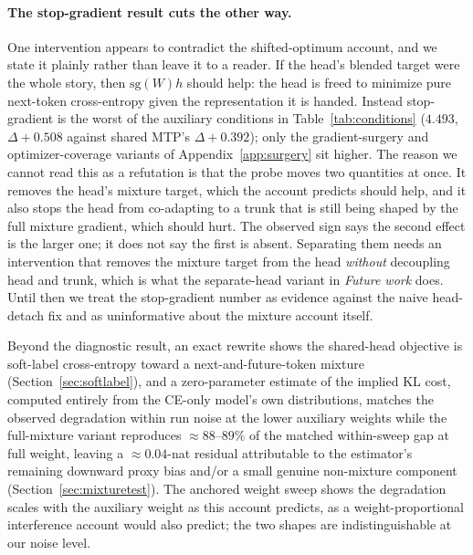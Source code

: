 \paragraph{The stop-gradient result cuts the other way.}
One intervention appears to contradict the shifted-optimum account, and we state it
plainly rather than leave it to a reader. If the head's blended target were the
whole story, then $\mathrm{sg}(W)h$ should help: the head is freed to minimize pure
next-token cross-entropy given the representation it is handed. Instead
stop-gradient is the worst of the auxiliary conditions in
Table~\ref{tab:conditions} ($4.493$, $\Delta{+}0.508$ against shared MTP's
$\Delta{+}0.392$); only the gradient-surgery and optimizer-coverage variants of
Appendix~\ref{app:surgery} sit higher. The reason we cannot read this as a refutation is
that the probe moves two quantities at once. It removes the head's mixture target,
which the account predicts should help, and it also stops the head from co-adapting
to a trunk that is still being shaped by the full mixture gradient, which should
hurt. The observed sign says the second effect is the larger one; it does not say
the first is absent. Separating them needs an intervention that removes the mixture
target from the head \emph{without} decoupling head and trunk, which is what the
separate-head variant in \emph{Future work} does. Until then we treat the
stop-gradient number as evidence against the naive head-detach fix and as
uninformative about the mixture account itself.

Beyond the diagnostic result, an exact rewrite shows the shared-head objective is
soft-label cross-entropy toward a next-and-future-token mixture
(Section~\ref{sec:softlabel}), and a zero-parameter estimate of the implied KL cost,
computed entirely from the CE-only model's own distributions, matches the observed
degradation within run noise at the lower auxiliary weights while the full-mixture
variant reproduces ${\approx}88$--$89\%$ of the matched within-sweep gap at full weight, leaving a
${\approx}0.04$-nat residual attributable to the estimator's remaining downward
proxy bias and/or a small genuine non-mixture component
(Section~\ref{sec:mixturetest}). The anchored weight sweep shows the degradation
scales with the auxiliary weight as this account predicts, as a weight-proportional
interference account would also predict; the two shapes are indistinguishable at our
noise level.

